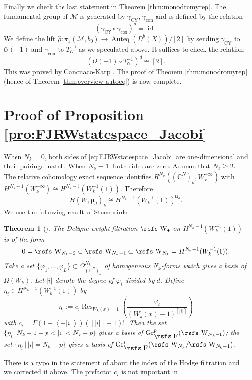\documentclass[11pt]{amsart}
\newtheorem{thm}{Theorem}[section] %
\theoremstyle{definition} %
\theoremstyle{remark} %
\newcommand{\CC}{\mathbb C}
\newcommand{\id}{\operatorname{id}}
\newcommand{\Res}{\operatorname{Res}}
\def\fracp#1{\left\langle #1 \right\rangle}
\def\ceil#1{\left \lceil #1 \right \rceil}
\newcommand{\marsfs}[1]{\mbox{\rsfs #1}}
\newcommand{\bmu}{\boldsymbol{\mu}}
\newcommand{\cO}{\mathcal{O}}
\newcommand{\cM}{\mathcal{M}}
\newcommand{\hrho}{\hat{\rho}}
\newcommand{\Auteq}{\operatorname{Auteq}}
\newcommand{\Gr}{\operatorname{Gr}} %
\newcommand{\CY}{\operatorname{CY}}
\newcommand{\con}{\operatorname{con}}
\newcommand{\rsF}{\marsfs{F}}
\newcommand{\rsW}{\marsfs{W}}
\begin{document}
Finally we check the last statement in Theorem \ref{thm:monodromyrep}. 
The fundamental group of $\cM$ is 
generated by $\gamma_{\CY}$, $\gamma_{\con}$ 
and is defined by the relation 
\[
(\gamma_{\CY} \circ \gamma_{\con})^d =\id.  
\]
We define the lift $\hrho \colon \pi_1(\cM,b_0) \to \Auteq(D^b(X))/[2]$ 
by sending $\gamma_{\CY}$ to $\cO(-1)$ and 
$\gamma_{\con}$ to $T_\cO^{-1}$ as we speculated above. 
It suffices to check the relation: 
\[
(O(-1) \circ T_\cO^{-1})^d \cong [2].     
\]
This was proved by Canonaco-Karp \cite{Cano-Karp}. 
The proof of Theorem \ref{thm:monodromyrep} 
(hence of Theorem \ref{thm:overview-autoeq}) 
is now complete. 

\appendix 
\section{Proof of Proposition \ref{pro:FJRWstatespace_Jacobi}}
\label{sec:proof-Jacobi} 
When $N_k=0$, both sides of \eqref{eq:FJRWstatespace_Jacobi}
are one-dimensional and their pairings match. 
When $N_k=1$, both sides are zero. 
Assume that $N_k\ge 2$. 
The relative cohomology exact sequence 
identifies $H^{N_k}((\CC^N)_k, W_k^{+\infty})$ with 
$H^{N_k-1}(W_k^{+\infty})\cong H^{N_k-1}(W_k^{-1}(1))$. 
Therefore 
\[
H(W,\bmu_d)_k \cong H^{N_k-1}(W_k^{-1}(1))^{\bmu_d}. 
\]
We use the following result of Steenbrink: 
\begin{thm}[{\cite[Theorem 1]{Steenbrink}}]  
The Deligne weight filtration $\rsW_\bullet$ 
on $H^{N_k-1}(W_k^{-1}(1))$ is of the form 
\[
0= \rsW_{N_k-2} \subset \rsW_{N_k-1} 
\subset \rsW_{N_k}= H^{N_k-1}(W_k^{-1}(1)). 
\]
Take a set $\{\varphi_1,\dots,\varphi_L\} \subset 
\Omega_{(\CC^N)_k}^{N_k}$ 
of homogeneous $N_k$-forms which gives 
a basis of $\Omega(W_k)$. 
Let $|i|$ denote the degree of $\varphi_i$ divided by $d$. 
Define $\eta_i \in H^{N_k-1}(W_k^{-1}(1))$ 
by 
\begin{equation} 
\label{eq:residue_form} 
\eta_i := c_i \Res_{W_k(x)=1} \left( 
\frac{\varphi_i}{(W_k(x)-1)^{\ceil{|i|}}}
\right) 
\end{equation}
with $c_i = \Gamma(1-\fracp{-|i|}) 
(\ceil{|i|}-1)!$. 
Then the set  $\{\eta_i \,|\, N_k-1-p<|i| < N_k-p\}$ 
gives a basis of 
$\Gr_{\rsF}^{p} (\rsW_{N_k-1})$; 
the set $\{\eta_i\, |\, |i|=N_k-p\}$ 
gives a basis of $\Gr_{\rsF}^{p} 
(\rsW_{N_k}/\rsW_{N_k-1})$. 
\end{thm} 
There is a typo in the statement of 
\cite[Theorem 1]{Steenbrink} about the 
index of the Hodge filtration and we 
corrected it above. 
The prefactor $c_i$ is not important in 
\end{document}
